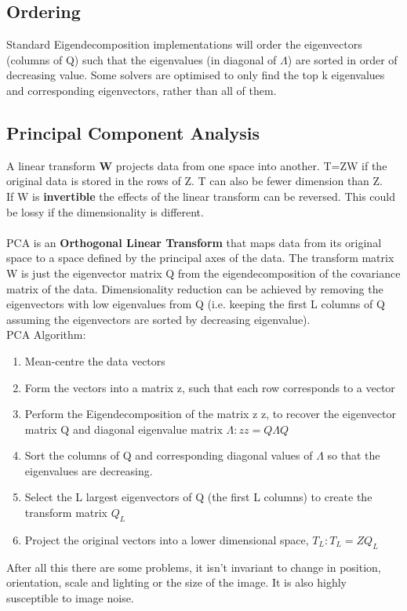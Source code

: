 \documentclass{article}
\begin{document}
	\subsection{Ordering}
	Standard Eigendecomposition implementations will order the eigenvectors (columns of Q) such that the eigenvalues (in diagonal of $\Lambda$) are sorted in order of decreasing value. Some solvers are optimised to only find the top k eigenvalues and corresponding eigenvectors, rather than all of them.
	\subsection{Principal Component Analysis}
	A linear transform \textbf{W} projects data from one space into another. T=ZW if the original data is stored in the rows of Z. T can also be fewer dimension than Z.\\
	If W is \textbf{invertible} the effects of the linear transform can be reversed. This could be lossy if the dimensionality is different.\\
	\\
	PCA is an \textbf{Orthogonal Linear Transform} that maps data from its original space to a space defined by the principal axes of the data. The transform matrix W is just the eigenvector matrix Q from the eigendecomposition of the covariance matrix of the data. Dimensionality reduction can be achieved by removing the eigenvectors with low eigenvalues from Q (i.e. keeping the first L columns of Q assuming the eigenvectors are sorted by decreasing eigenvalue).\\
	PCA Algorithm:
	\begin{enumerate}
		\item Mean-centre the data vectors
		\item Form the vectors into a matrix z, such that each row corresponds to a vector
		\item Perform the Eigendecomposition of the matrix z z, to recover the eigenvector matrix Q and diagonal eigenvalue matrix $\Lambda: z z = Q\Lambda Q$
		\item Sort the columns of Q and corresponding diagonal values of $\Lambda$ so that the eigenvalues are decreasing.
		\item Select the L largest eigenvectors of Q (the first L columns) to create the transform matrix $Q_L$
		\item Project the original vectors into a lower dimensional space, $T_L: T_L = ZQ_L$
	\end{enumerate}
	After all this there are some problems, it isn't invariant to change in position, orientation, scale and lighting or the size of the image. It is also highly susceptible to image noise.
\end{document}

